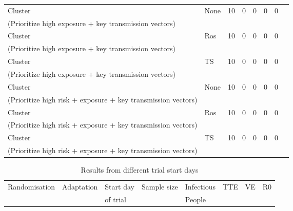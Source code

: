 \documentclass[a4paper]{article}
\begin{document}
\begin{landscape}
\begin{table}[]
\begin{tabular}{|l|l|l|l|l|l|l|l|}
				Cluster & None & 10 & 0 & 0 & 0 & 0  & \\
				(Prioritize high exposure + key transmission vectors) &  &  &  &  &  &  & \\
				Cluster & Ros & 10 & 0 & 0 & 0 & 0  & \\
				(Prioritize high exposure + key transmission vectors) &  &  &  &  &  &  & \\
				Cluster & TS & 10 & 0 & 0 & 0 & 0  & \\
				(Prioritize high exposure + key transmission vectors) &  &  &  &  &  &  & \\
				Cluster & None & 10 & 0 & 0 & 0 & 0  & \\
				(Prioritize high risk + exposure + key transmission vectors) &  &  &  &  &  &  & \\
				Cluster & Ros & 10 & 0 & 0 & 0 & 0  & \\
				(Prioritize high risk + exposure + key transmission vectors) &  &  &  &  &  &  & \\
				Cluster & TS & 10 & 0 & 0 & 0 & 0  & \\
				(Prioritize high risk + exposure + key transmission vectors) &  &  &  &  &  &  & \\
				\hline \hline 
			\end{tabular}
		\end{table}
		
		\begin{table}[]
			\centering
			\caption{Results from different trial start days}
			\label{trial_start_days}
			\begin{tabular}{|l|l|l|l|l|l|l|l|} \hline
				Randomisation & Adaptation & Start day & Sample size & Infectious & TTE & VE & R0\\
				& & of trial & & People &  &  & \\ \hline \hline
			\end{tabular}
		\end{table}
	\end{landscape}
	
	\newpage	
	\label{Bibliography}
	
	
	
\end{document}
